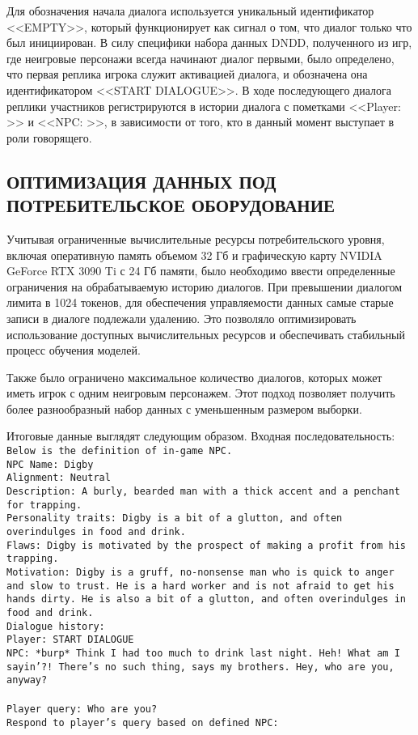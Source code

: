 Для обозначения начала диалога используется уникальный идентификатор <<EMPTY>>, который функционирует как сигнал о том, что диалог только что был инициирован. В силу специфики набора данных DNDD, полученного из игр, где неигровые персонажи всегда начинают диалог первыми, было определено, что первая реплика игрока служит активацией диалога, и обозначена она идентификатором <<START DIALOGUE>>. В ходе последующего диалога реплики участников регистрируются в истории диалога с пометками <<Player: >> и <<NPC: >>, в зависимости от того, кто в данный момент выступает в роли говорящего.

\subsection{ОПТИМИЗАЦИЯ ДАННЫХ ПОД ПОТРЕБИТЕЛЬСКОЕ ОБОРУДОВАНИЕ}

Учитывая ограниченные вычислительные ресурсы потребительского уровня, включая оперативную память объемом 32 Гб и графическую карту NVIDIA GeForce RTX 3090 Ti с 24 Гб памяти, было необходимо ввести определенные ограничения на обрабатываемую историю диалогов. При превышении диалогом лимита в 1024 токенов, для обеспечения управляемости данных самые старые записи в диалоге подлежали удалению. Это позволяло оптимизировать использование доступных вычислительных ресурсов и обеспечивать стабильный процесс обучения моделей. 

Также было ограничено максимальное количество диалогов, которых может иметь игрок с одним неигровым персонажем. Этот подход позволяет получить более разнообразный набор данных с уменьшенным размером выборки.

Итоговые данные выглядят следующим образом.
Входная последовательность:
\texttt{\\Below is the definition of in-game NPC.\\
      NPC Name: Digby\\
      Alignment: Neutral\\
      Description: A burly, bearded man with a thick accent and a penchant for trapping.\\
      Personality traits: Digby is a bit of a glutton, and often overindulges in food and drink.\\
      Flaws: Digby is motivated by the prospect of making a profit from his trapping.\\
      Motivation: Digby is a gruff, no-nonsense man who is quick to anger and slow to trust. He is a hard worker and is not afraid to get his hands dirty. He is also a bit of a glutton, and often overindulges in food and drink.\\
      Dialogue history:\\
      Player: START DIALOGUE\\
      NPC: *burp* Think I had too much to drink last night. Heh! What am I sayin'?! There's no such thing, says my brothers. Hey, who are you, anyway?\\\\
      Player query: Who are you?\\
      Respond to player's query based on defined NPC:\\}

